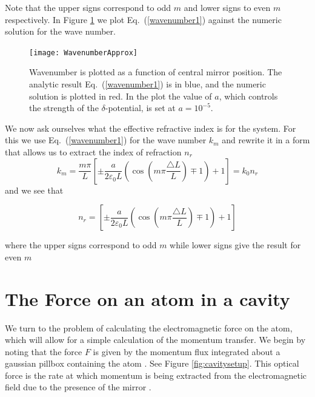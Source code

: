 \documentclass[twocolumn,english,pra,aps,superscriptaddress,floatfix]{revtex4-1}
\begin{document}
Note that the upper signs correspond to odd $m$ and lower signs to
even $m$ respectively.  In Figure \ref{fig:wavenumberapprox} we plot Eq.\ (\ref{wavenumber1}) against the numeric solution for the wave number. 



\begin{figure}
\texttt{[image: WavenumberApprox]}
\caption{Wavenumber is plotted as a function of central mirror position.  The analytic result Eq.\ (\ref{wavenumber1}) is in blue, and the numeric solution is plotted in red.  In the plot the value of $a$, which controls the strength of the $\delta$-potential, is set at $a=10^{-5}$. }
\label{fig:wavenumberapprox}
\end{figure}

We now ask ourselves what the effective refractive index is for the system. For this we use Eq.\ (\ref{wavenumber1}) for the wave number $k_{m}$ and rewrite it in a form that allows us to extract the index of refraction $n_{r}$
\begin{equation}
k_{m}=\frac{m\pi}{L}\left[\pm\frac{a}{2\varepsilon_{0}L}\left(\cos(m\pi\frac{\triangle L}{L})\mp1\right)+1\right]=k_{0} n_{r}
\label{wavenumber2}
\end{equation}
and we see that

\begin{equation}
n_{r}=\left[\pm\frac{a}{2\varepsilon_{0}L}\left(\cos(m\pi\frac{\triangle L}{L})\mp1\right)+1\right]
\label{refractiveindex}
\end{equation}

where the upper signs correspond to odd $m$ while lower signs give the result for even $m$

\section{The Force on an atom in a cavity}
\label{sec:force}
We turn to the problem of calculating the electromagnetic force on the atom, which will allow for a simple calculation of the momentum transfer. We begin by noting that the force $F$ is given by the momentum flux integrated about a gaussian pillbox containing the atom \cite{domokos08}. See Figure \ref{fig:cavitysetup}.  This optical force is the rate at which momentum is being extracted from the electromagnetic field due to the presence of the mirror  \cite{griffiths}.  
\end{document}

